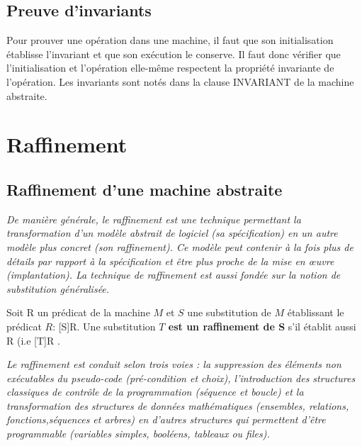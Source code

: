 \documentclass[10pt,a4paper]{article}
\begin{document}
\subsection{Preuve d'invariants}


Pour prouver une opération dans une machine, il faut que son initialisation établisse l’invariant et que son exécution le conserve. Il faut donc vérifier que l’initialisation et l’opération elle-même respectent la propriété invariante de l’opération. Les invariants sont notés dans la clause INVARIANT de la machine abstraite. 

\section{Raffinement}

\subsection{Raffinement d'une machine abstraite}
\emph{De manière générale, le raffinement est une technique permettant la transformation d’un modèle abstrait de logiciel (sa spécification) en un autre modèle plus concret (son raffinement). Ce modèle peut contenir à la fois plus de détails par rapport à la spécification et être plus proche de la mise en œuvre (implantation). La technique de raffinement est aussi fondée sur la notion de substitution généralisée.}\cite{dossierTechnique}

Soit R un prédicat de la machine $M$ et $S$ une substitution de $M$ établissant le prédicat $R$: [S]R.
Une substitution \textbf{$T$ est un raffinement de S} s'il établit aussi R (i.e [T]R .

\emph{Le raffinement est conduit selon trois voies : la suppression des éléments non exécutables du pseudo-code (pré-condition et choix), l’introduction des structures classiques de contrôle de la programmation (séquence et boucle) et la transformation des structures de données mathématiques (ensembles, relations, fonctions,séquences et arbres) en d’autres structures qui permettent d’être programmable (variables simples, booléens, tableaux ou files).}\cite{dossierTechnique}
\end{document}
